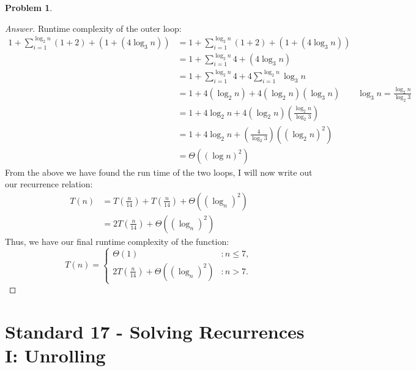 \documentclass[11pt]{article}
\theoremstyle{definition}
\theoremstyle{definition}
\newtheorem{required}{Problem}
\theoremstyle{definition}
\begin{document}
\begin{required}
\begin{enumerate}[label=(\alph*)]
\begin{proof}[Answer]
Runtime complexity of the outer loop: \\
\begin{align*}
1 + \sum_{i=1}^{\log_2 n} (1 + 2) + (1 + (4\log_3 n))&= 1 + \sum_{i=1}^{\log_2 n}  (1 + 2) +  (1 + (4\log_3 n))\\
&=1 + \sum_{i=1}^{\log_2 n} 4 + (4\log_3 n)\\
&= 1 + \sum_{i=1}^{\log_2 n} 4 + 4\sum_{i=1}^{\log_2 n} \log_3 n \\
&= 1 + 4(\log_2 n) + 4(\log_2 n)(\log_3 n) \qquad \log_3 n = \frac{\log_2 n}{\log_2 3}\\
&= 1 + 4\log_2 n + 4(\log_2 n)(\frac{\log_2 n}{\log_2 3}) \\
&= 1 + 4\log_2 n + (\frac{4}{\log_2 3})((\log_2 n)^2) \\
&= \Theta((\log n)^2)
\end{align*}
From the above we have found the run time of the two loops, I will now write out our recurrence relation: \\
\begin{align*}
T(n) &= T(\frac{n}{14}) + T(\frac{n}{14}) + \Theta((\log_n)^2)\\
&= 2T(\frac{n}{14}) + \Theta((\log_n)^2)
\end{align*}
Thus, we have our final runtime complexity of the function: \\
$$
T(n) = \begin{cases}
\Theta(1) & : n \leq7, \\
2T(\frac{n}{14}) + \Theta((\log_n)^2) & : n > 7.
\end{cases}
$$





\end{proof}

\end{enumerate}

\end{required}

\newpage
\section{Standard 17 - Solving Recurrences I: Unrolling}
\end{document}
